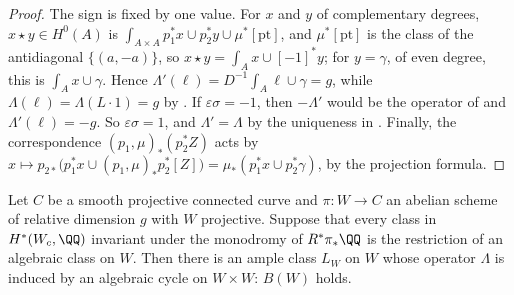 \begin{proof}
The sign is fixed by one value. For $x$ and $y$ of complementary degrees,
$x\star y\in H^{0}(A)$ is $\int_{A\times A}p_{1}^{*}x\cup p_{2}^{*}y\cup
\mu^{*}[\mathrm{pt}]$, and $\mu^{*}[\mathrm{pt}]$ is the class of the
antidiagonal $\{(a,-a)\}$, so $x\star y=\int_{A}x\cup[-1]^{*}y$; for
$y=\gamma$, of even degree, this is $\int_{A}x\cup\gamma$. Hence
$\Lambda'(\ell)=D^{-1}\int_{A}\ell\cup\gamma=g$, while
$\Lambda(\ell)=\Lambda(L\cdot1)=g$ by \cite[Lemma~10.7]{paperI}. If
$\varepsilon\sigma=-1$, then $-\Lambda'$ would be the operator of
\cite[Definition~10.6]{paperI} and $\Lambda'(\ell)=-g$. So $\varepsilon\sigma=1$, and
$\Lambda'=\Lambda$ by the uniqueness in \cite[Definition~10.6]{paperI}. Finally, the
correspondence $(p_{1},\mu)_{*}(p_{2}^{*}Z)$ acts by
$x\mapsto p_{2*}\bigl(p_{1}^{*}x\cup(p_{1},\mu)_{*}p_{2}^{*}[Z]\bigr)
=\mu_{*}(p_{1}^{*}x\cup p_{2}^{*}\gamma)$, by the projection formula.
\end{proof}

\begin{theorem}
\label{thm:lefschetzfamily}
Let $C$ be a smooth projective connected curve and $\pi\colon W\to C$ an
abelian scheme of relative dimension $g$ with $W$ projective. Suppose that
every class in $H^{*}(W_{c},\QQ)$ invariant under the monodromy of
$R^{*}\pi_{*}\QQ$ is the restriction of an algebraic class on $W$. Then there
is an ample class $L_{W}$ on $W$ whose operator $\Lambda$ is induced by an
algebraic cycle on $W\times W$: $B(W)$ holds.
\end{theorem}

